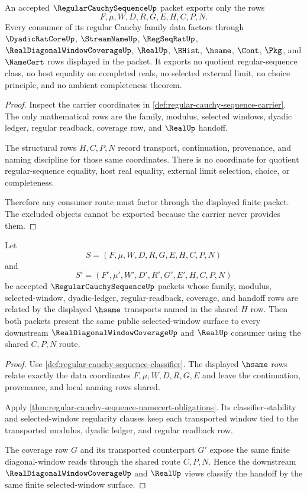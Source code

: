 \begin{lemma}
\label{lem:regular-cauchy-sequence-non-escape}
An accepted $\RegularCauchySequenceUp$ packet exports only the rows
$$
F,\mu,W,D,R,G,E,H,C,P,N.
$$
Every consumer of its regular Cauchy family data factors through $\DyadicRatCoreUp$, $\StreamNameUp$, $\RegSeqRatUp$, $\RealDiagonalWindowCoverageUp$, $\RealUp$, $\BHist$, $\hsame$, $\Cont$, $\Pkg$, and $\NameCert$ rows displayed in the packet. It exports no quotient regular-sequence class, no host equality on completed reals, no selected external limit, no choice principle, and no ambient completeness theorem.
\end{lemma}
\begin{proof}
Inspect the carrier coordinates in \autoref{def:regular-cauchy-sequence-carrier}. The only mathematical rows are the family, modulus, selected windows, dyadic ledger, regular readback, coverage row, and $\RealUp$ handoff.

The structural rows $H,C,P,N$ record transport, continuation, provenance, and naming discipline for those same coordinates. There is no coordinate for quotient regular-sequence equality, host real equality, external limit selection, choice, or completeness.

Therefore any consumer route must factor through the displayed finite packet. The excluded objects cannot be exported because the carrier never provides them.
\end{proof}

\begin{lemma}
\label{lem:regular-cauchy-sequence-transport-stability}
Let
$$
S=(F,\mu,W,D,R,G,E,H,C,P,N)
$$
and
$$
S'=(F',\mu',W',D',R',G',E',H,C,P,N)
$$
be accepted $\RegularCauchySequenceUp$ packets whose family, modulus, selected-window, dyadic-ledger, regular-readback, coverage, and handoff rows are related by the displayed $\hsame$ transports named in the shared $H$ row. Then both packets present the same public selected-window surface to every downstream $\RealDiagonalWindowCoverageUp$ and $\RealUp$ consumer using the shared $C,P,N$ route.
\end{lemma}
\begin{proof}
Use \autoref{def:regular-cauchy-sequence-classifier}. The displayed $\hsame$ rows relate exactly the data coordinates $F,\mu,W,D,R,G,E$ and leave the continuation, provenance, and local naming rows shared.

Apply \autoref{thm:regular-cauchy-sequence-namecert-obligations}. Its classifier-stability and selected-window regularity clauses keep each transported window tied to the transported modulus, dyadic ledger, and regular readback row.

The coverage row $G$ and its transported counterpart $G'$ expose the same finite diagonal-window reads through the shared route $C,P,N$. Hence the downstream $\RealDiagonalWindowCoverageUp$ and $\RealUp$ views classify the handoff by the same finite selected-window surface.
\end{proof}

